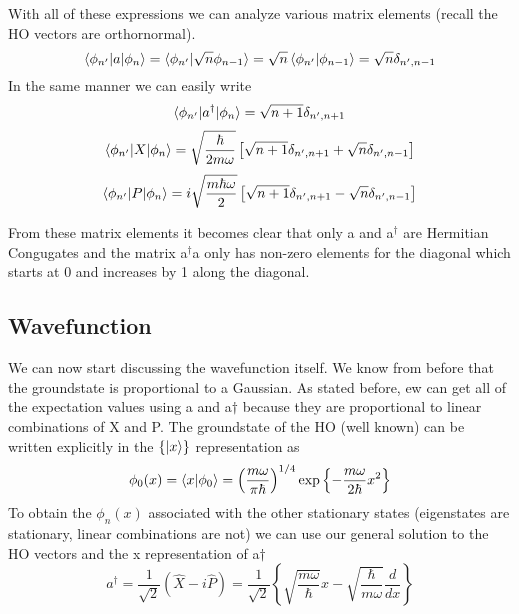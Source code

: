 \documentclass{article}
\newcommand{\be}{\begin{equation}}
\newcommand{\ee}{\end{equation}}
\newcommand{\dg}{\dagger}
\begin{document}
With all of these expressions we can analyze various matrix elements (recall the HO vectors are orthornormal).
\be
\braket{\phi_{n'}|a|\phi_n} =  \braket{\phi_{n'}|\sqrt{n}\phi_{n-1}} = \sqrt{n}\braket{\phi_{n'}|\phi_{n-1}} = \sqrt{n} \delta_{n',n-1}
\ee
In the same manner we can easily write 
\be
\braket{\phi_{n'}|a^\dg|\phi_n} =\sqrt{n+1} \delta_{n',n+1}
\ee
\be
\braket{\phi_{n'}|X|\phi_n} = \sqrt{\frac{\hbar}{2m\omega}}\left[\sqrt{n+1}\delta_{n',n+1} + \sqrt{n} \delta_{n',n-1}\right]
\ee
\be
\braket{\phi_{n'}|P|\phi_n} = i\sqrt{\frac{m\hbar\omega}{2}}\left[\sqrt{n+1}\delta_{n',n+1} - \sqrt{n} \delta_{n',n-1}\right]
\ee

From these matrix elements it becomes clear that only a and a$^\dg$ are Hermitian Congugates and the matrix a$^\dg$a only has non-zero elements for the diagonal which starts at 0 and increases by 1 along the diagonal. 

\subsection*{Wavefunction}
We can now start discussing the wavefunction itself.
We know from before that the groundstate  is proportional to a Gaussian.
As stated before, ew can get all of the expectation values using a and a$\dg$ because they are proportional to linear combinations of X and P.
The groundstate of the HO (well known) can be written explicitly in the $\{\ket{x}\}$ representation as
\be
\phi_0(x) = \braket{x|\phi_0} = \left(\frac{m\omega}{\pi\hbar}\right)^{1/4} \text{exp} \left\{-\frac{m\omega}{2\hbar}x^2\right\}
\ee
To obtain the $\phi_n(x)$ associated with the other stationary states (eigenstates are stationary, linear combinations are not) we can use our general solution to the HO vectors and the x representation of a$\dg$
\be
a^\dg = \frac{1}{\sqrt{2}} \left(\hat{X} - i\hat{P}\right) = \frac{1}{\sqrt{2}} \left\{ \sqrt{\frac{m\omega}{\hbar}} x - \sqrt{\frac{\hbar}{m\omega}}\frac{d}{dx}\right\}
\ee
\end{document}
